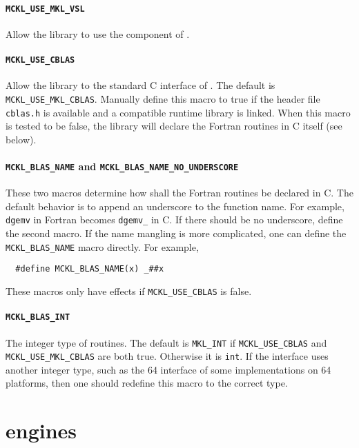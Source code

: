 \paragraph{\texttt{MCKL\_USE\_MKL\_VSL}} Allow the library to use the \vsl
component of \mkl.

\paragraph{\texttt{MCKL\_USE\_CBLAS}} Allow the library to the standard C
interface of \blas. The default is \verb|MCKL_USE_MKL_CBLAS|. Manually define
this macro to true if the header file \verb|cblas.h| is available and a
compatible runtime library is linked. When this macro is tested to be false,
the library will declare the \blas Fortran routines in C itself (see below).

\paragraph{\texttt{MCKL\_BLAS\_NAME} and
  \texttt{MCKL\_BLAS\_NAME\_NO\_UNDERSCORE}} These two macros determine how
shall the \blas Fortran routines be declared in C. The default behavior is to
append an underscore to the function name. For example, \verb|dgemv| in Fortran
becomes \verb|dgemv_| in C. If there should be no underscore, define the second
macro. If the name mangling is more complicated, one can define the
\verb|MCKL_BLAS_NAME| macro directly. For example,
\begin{Verbatim}
  #define MCKL_BLAS_NAME(x) _##x
\end{Verbatim}
These macros only have effects if \verb|MCKL_USE_CBLAS| is false.

\paragraph{\texttt{MCKL\_BLAS\_INT}} The integer type of \blas routines. The
default is \verb|MKL_INT| if \verb|MCKL_USE_CBLAS| and
\verb|MCKL_USE_MKL_CBLAS| are both true. Otherwise it is \verb|int|. If the
\blas interface uses another integer type, such as the \ilp{}64 interface of
some implementations on \lp{}64 platforms, then one should redefine this macro
to the correct type.

\section{\texorpdfstring{\protect\rng}{RNG} engines}
\label{sec:RNG engines}


